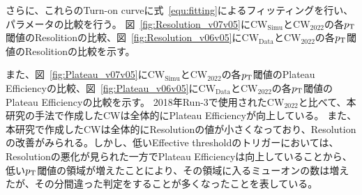 さらに、これらのTurn-on curveに式~\eqref{equ:fitting}によるフィッティングを行い、パラメータの比較を行う。
図~\ref{fig:Resolution_v07v05}に$\mathrm{CW_{Simu}}$と$\mathrm{CW_{2022}}$の各$p_{\rm{T}}$閾値のResolitionの比較、図~\ref{fig:Resolution_v06v05}に$\mathrm{CW_{Data}}$と$\mathrm{CW_{2022}}$の各$p_{\rm{T}}$閾値のResolitionの比較を示す。



また、図~\ref{fig:Plateau_v07v05}に$\mathrm{CW_{Simu}}$と$\mathrm{CW_{2022}}$の各$p_{\rm{T}}$閾値のPlateau Efficiencyの比較、図~\ref{fig:Plateau_v06v05}に$\mathrm{CW_{Data}}$と$\mathrm{CW_{2022}}$の各$p_{\rm{T}}$閾値のPlateau Efficiencyの比較を示す。
2018年Run-3で使用された$\mathrm{CW_{2022}}$と比べて、本研究の手法で作成したCWは全体的にPlateau Efficiencyが向上している。
また、本研究で作成したCWは全体的にResolutionの値が小さくなっており、Resolutionの改善がみられる。しかし、低いEffective thresholdのトリガーにおいては、Resolutionの悪化が見られた一方でPlateau Efficiencyは向上していることから、低い$p_{\rm{T}}$閾値の領域が増えたことにより、その領域に入るミューオンの数は増えたが、その分間違った判定をすることが多くなったことを表している。
